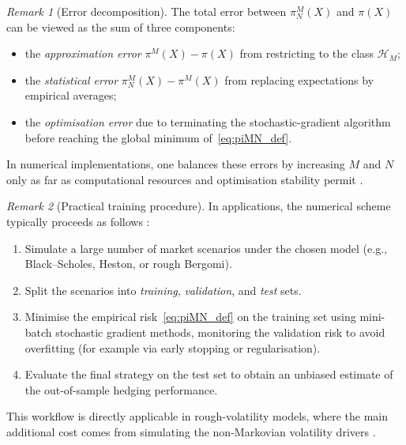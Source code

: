 \documentclass[12pt,a4paper]{article}
\theoremstyle{definition}
\theoremstyle{plain}
\theoremstyle{remark}
\newtheorem{remark}{Remark}[section]
\theoremstyle{plain}
\begin{document}
\begin{remark}[Error decomposition]\label{rem:error_decomposition}
The total error between $\pi^{M}_N(X)$ and $\pi(X)$ can be viewed as the sum of three components:
\begin{itemize}
    \item the \emph{approximation error} $\pi^{M}(X)-\pi(X)$ from restricting to the class $\mathcal H_M$;
    \item the \emph{statistical error} $\pi^{M}_N(X)-\pi^{M}(X)$ from replacing expectations by empirical averages;
    \item the \emph{optimisation error} due to terminating the stochastic-gradient algorithm before reaching the global minimum of~\eqref{eq:piMN_def}.
\end{itemize}
In numerical implementations, one balances these errors by increasing $M$ and $N$ only as far as computational resources and optimisation stability permit \cite{Buehler2019DeepHedging,HighamHigham2019DeepLearning}.
\end{remark}

\begin{remark}[Practical training procedure]\label{rem:practical_training}
In applications, the numerical scheme typically proceeds as follows \cite{Buehler2019DeepHedging,Horvath2021DeepRough}:
\begin{enumerate}
    \item Simulate a large number of market scenarios under the chosen model (e.g., Black--Scholes, Heston, or rough Bergomi).
    \item Split the scenarios into \emph{training}, \emph{validation}, and \emph{test} sets.
    \item Minimise the empirical risk~\eqref{eq:piMN_def} on the training set using mini-batch stochastic gradient methods, monitoring the validation risk to avoid overfitting (for example via early stopping or regularisation).
    \item Evaluate the final strategy on the test set to obtain an unbiased estimate of the out-of-sample hedging performance.
\end{enumerate}
This workflow is directly applicable in rough-volatility models, where the main additional cost comes from simulating the non-Markovian volatility drivers \cite{Horvath2021DeepRough}.
\end{remark}
\end{document}
